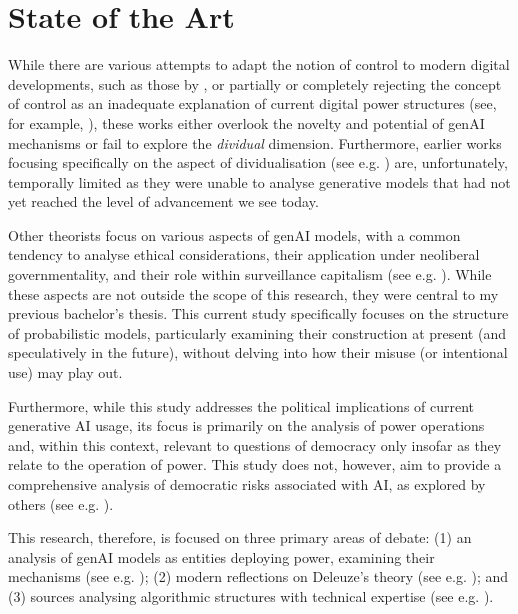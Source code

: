 \section{State of the Art}


While there are various attempts to adapt the notion of control to modern
digital developments, such as those by \cite{brusseau2020}, or partially or completely rejecting the concept of control as an inadequate explanation of current digital power structures (see, for example, \cite{hui2015}), these works either overlook the novelty and potential of genAI mechanisms or fail to explore the \textit{dividual} dimension.  Furthermore, earlier works focusing specifically on the aspect of dividualisation (see e.g. \cite{Cheney2011, Otterlo2013}) are, unfortunately, temporally limited as they were unable to analyse generative models that had not yet reached the level of advancement we see today.

Other theorists focus on various aspects of genAI models, with a common tendency to analyse ethical considerations, their application under neoliberal governmentality, and their role within surveillance capitalism (see e.g. \cite{zuboff2019, gillespie2024, Haggerty2000}). While these aspects are not outside the scope of this research, they were central to my previous bachelor's thesis.  This current study specifically focuses on the structure of probabilistic models, particularly examining their construction at present (and speculatively in the future), without delving into how their misuse (or intentional use) may play out.

Furthermore, while this study addresses the political implications of current generative AI usage, its focus is primarily on the analysis of power operations and, within this context, relevant to questions of democracy only insofar as they relate to the operation of power.  This study does not, however, aim to provide a comprehensive analysis of democratic risks associated with AI, as explored by others (see e.g. \cite{zarkadakes2020, coeckelbergh2024}).

This research, therefore, is focused on three primary areas of debate: (1) an analysis of genAI models as entities deploying power, examining their mechanisms (see e.g. \cite{amoore2024, konik2015, mackenzie2021}); (2) modern reflections on Deleuze's theory (see e.g. \cite{mischke2021c, poster2010}); and (3) sources analysing algorithmic structures with technical expertise (see e.g. \cite{vaswani, bender2021b}).


